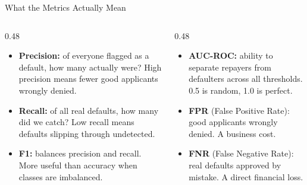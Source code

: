\documentclass[aspectratio=169, 10pt]{beamer}
\begin{document}
\begin{frame}{What the Metrics Actually Mean}
 \begin{columns}[T]

 \begin{column}{0.48\textwidth}
 \begin{itemize}
 \item \textbf{Precision:} of everyone flagged as a
 default, how many actually were? High precision
 means fewer good applicants wrongly denied.
 \vspace{0.5em}
 \item \textbf{Recall:} of all real defaults, how many
 did we catch? Low recall means defaults
 slipping through undetected.
 \vspace{0.5em}
 \item \textbf{F1:} balances precision and recall.
 More useful than accuracy when classes
 are imbalanced.
 \end{itemize}
 \end{column}

 \begin{column}{0.48\textwidth}
 \begin{itemize}
 \item \textbf{AUC-ROC:} ability to separate repayers
 from defaulters across all thresholds.
 0.5 is random, 1.0 is perfect.
 \vspace{0.5em}
 \item \textbf{FPR} (False Positive Rate): good
 applicants wrongly denied. A business cost.
 \vspace{0.5em}
 \item \textbf{FNR} (False Negative Rate): real defaults
 approved by mistake. A direct financial loss.
 \end{itemize}
 \end{column}

 \end{columns}
\end{frame}
\end{document}
